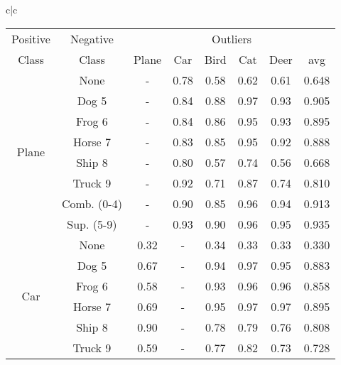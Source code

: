 \documentclass[acmtog, nonacm]{acmart}
\begin{document}
\begin{tabular}{c|c}
     
     \begin{tabular}{@{}c|c|ccccc|c@{}}
\midrule
Positive & Negative&\multicolumn{6}{c}{Outliers} \\
\hspace{.25em}Class &\hspace{.25em}Class & Plane & Car  & Bird & Cat  & Deer & avg\\
\midrule
\multirow{8}{*}{Plane} &None&	-&	0.78&	0.58&	0.62&	0.61&	0.648\\
& Dog 5                     & -     & 0.84 & 0.88 & 0.97 & 0.93 & 0.905                \\
                       & Frog 6                    & -     & 0.84 & 0.86 & 0.95 & 0.93 & 0.895                \\
                       & Horse 7                   & -     & 0.83 & 0.85 & 0.95 & 0.92 & 0.888                \\
                       & Ship 8                    & -     & 0.80 & 0.57 & 0.74 & 0.56 & 0.668                \\
                       & Truck 9                   & -     & 0.92 & 0.71 & 0.87 & 0.74 & 0.810                \\
                       & Comb. (0-4)               & -     & 0.90 & 0.85 & 0.96 & 0.94 & 0.913                \\
                       & Sup. (5-9)                & -     & 0.93 & 0.90 & 0.96 & 0.95 & 0.935                \\
                       \midrule
\multirow{8}{*}{Car}   & None                      & 0.32  & -    & 0.34 & 0.33 & 0.33 & 0.330                \\
                       & Dog 5                     & 0.67  & -    & 0.94 & 0.97 & 0.95 & 0.883                \\
                       & Frog 6                    & 0.58  & -    & 0.93 & 0.96 & 0.96 & 0.858                \\
                       & Horse 7                   & 0.69  & -    & 0.95 & 0.97 & 0.97 & 0.895                \\
                       & Ship 8                    & 0.90  & -    & 0.78 & 0.79 & 0.76 & 0.808                \\
                       & Truck 9                   & 0.59  & -    & 0.77 & 0.82 & 0.73 & 0.728                \\

\end{tabular}
\end{tabular}
\end{document}
